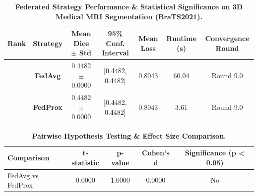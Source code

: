
\begin{table}[t]
\centering
\caption{\textbf{Federated Strategy Performance & Statistical Significance on 3D Medical MRI Segmentation (BraTS2021).}}
\label{tab:fedmed_benchmark_results}
\begin{tabular}{lcccccc}
\hline
\textbf{Rank} & \textbf{Strategy} & \textbf{Mean Dice $\pm$ Std} & \textbf{95\% Conf. Interval} & \textbf{Mean Loss} & \textbf{Runtime (s)} & \textbf{Convergence Round} \\
\hline
#1 & \textbf{FedAvg} & 0.4482 $\pm$ 0.0000 & [0.4482, 0.4482] & 0.8043 & 60.04 & Round 9.0 \\
#2 & \textbf{FedProx} & 0.4482 $\pm$ 0.0000 & [0.4482, 0.4482] & 0.8043 & 3.61 & Round 9.0 \\
\hline
\end{tabular}
\end{table}

\begin{table}[h]
\centering
\caption{\textbf{Pairwise Hypothesis Testing \& Effect Size Comparison.}}
\label{tab:statistical_tests}
\begin{tabular}{lcccc}
\hline
\textbf{Comparison} & \textbf{t-statistic} & \textbf{p-value} & \textbf{Cohen's d} & \textbf{Significance (p < 0.05)} \\
\hline
FedAvg vs FedProx & 0.0000 & 1.0000 & 0.0000 & No \\
\hline
\end{tabular}
\end{table}